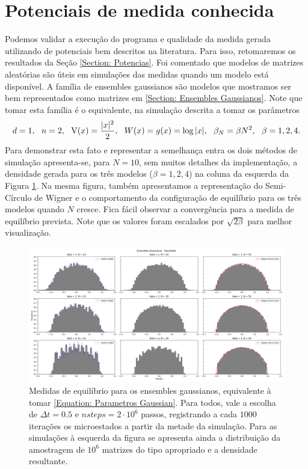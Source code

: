 \section{Potenciais de medida conhecida}

Podemos validar a execução do programa e qualidade da medida gerada utilizando de potenciais bem descritos na literatura. Para isso, retomaremos os resultados da Seção \ref{Section: Potencias}. Foi comentado que modelos de matrizes aleatórias são úteis em simulações das medidas quando um modelo está disponível. A família de ensembles gaussianos são modelos que mostramos ser bem representados como matrizes em \ref{Section: Ensembles Gaussianos}. Note que tomar esta família é o equivalente, na simulação descrita a tomar os parâmetros 
\begin{equation}
d = 1, \ \  n = 2, \ \ \operatorname{V}(x)=\frac{|x|^2}{2}, \ \ W(x) = g(x) = \log{|x|}, \ \ \beta_N = \beta N^2, \ \ \beta = 1,2,4.
\label{Equation: Parametros Gaussian}
\end{equation}
Para demonstrar esta fato e representar a semelhança entra os dois métodos de simulação apresenta-se, para $N=10$, sem muitos detalhes da implementação, a densidade gerada para os três modelos ($\beta = 1,2,4$) na coluna da esquerda da Figura \ref{Figura: Gaussian}. Na mesma figura, também apresentamos a representação do Semi-Círculo de Wigner e o comportamento da configuração de equilíbrio para os três modelos quando $N$ cresce. Fica fácil observar a convergência para a medida de equilíbrio prevista. Note que os valores foram escalados por $\sqrt{2\beta}$ para melhor visualização.
\begin{figure}[ht]
	\includegraphics[width=\textwidth]{Assets/validationGaussian.png}
	\caption{Medidas de equilíbrio para os ensembles gaussianos, equivalente à tomar \ref{Equation: Parametros Gaussian}. Para todos, vale a escolha de $\Delta t = 0.5$ e $nsteps = 2\cdot10^6$ passos, registrando a cada $1000$ iterações os microestados a partir da metade da simulação. Para as simulações à esquerda da figura se apresenta ainda a distribuição da amostragem de $10^6$ matrizes do tipo apropriado e a densidade resultante.}
	\label{Figura: Gaussian}
\end{figure}

